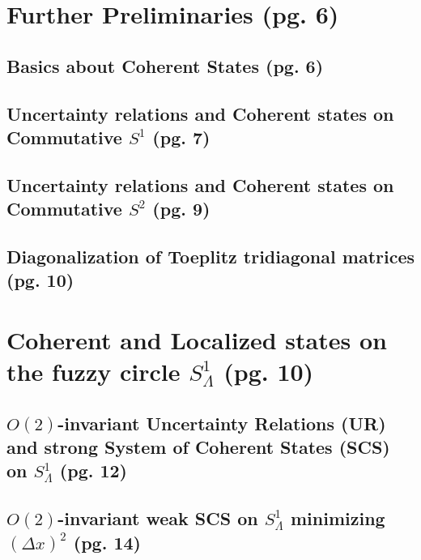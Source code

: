 \documentclass{article}
\begin{document}
\section{Further Preliminaries (pg. 6)}

\subsection{Basics about Coherent States (pg. 6)}

\subsection{Uncertainty relations and Coherent states on Commutative $S^1$ (pg. 7)}

\subsection{Uncertainty relations and Coherent states on Commutative $S^2$ (pg. 9)}

\subsection{Diagonalization of Toeplitz tridiagonal matrices (pg. 10)}

\section{Coherent and Localized states on the fuzzy circle $S^1_{\Lambda}$ (pg. 10)}

\subsection{$O(2)$-invariant Uncertainty Relations (UR) and strong System of Coherent States (SCS) on $S^1_\Lambda$ (pg. 12)}

\subsection{$O(2)$-invariant weak SCS on $S^1_\Lambda$ minimizing $(\Delta x)^2$ (pg. 14)}
\end{document}
